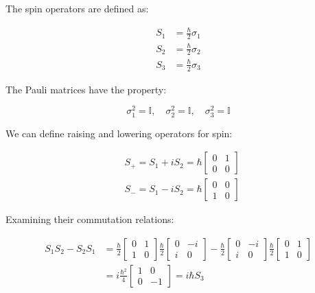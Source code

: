 \documentclass[italian]{HKNdocument}
\begin{document}
The spin operators are defined as:

\begin{align}
S_{1} & =\frac{\hbar}{2} \sigma_{1} \\
S_{2} & =\frac{\hbar}{2} \sigma_{2}  \label{eq:11.5}\\
S_{3} & =\frac{\hbar}{2} \sigma_{3}
\end{align}

The Pauli matrices have the property:

\begin{equation}
\sigma_{1}^{2}=\mathbb{I}, \quad \sigma_{2}^{2}=\mathbb{I}, \quad \sigma_{3}^{2}=\mathbb{I} \label{eq:11.6}
\end{equation}

We can define raising and lowering operators for spin:

\begin{align}
& S_{+}=S_{1}+i S_{2}=\hbar\left[\begin{array}{ll}
0 & 1 \\
0 & 0
\end{array}\right] \\
& S_{-}=S_{1}-i S_{2}=\hbar\left[\begin{array}{ll}
0 & 0 \\
1 & 0
\end{array}\right] \label{eq:11.7}
\end{align}

Examining their commutation relations:

\begin{align}
S_1 S_2 - S_2 S_1 &= \frac{\hbar}{2}\left[\begin{array}{ll}
0 & 1 \\
1 & 0
\end{array}\right] \frac{\hbar}{2}\left[\begin{array}{cc}
0 & -i \\
i & 0
\end{array}\right] - \frac{\hbar}{2}\left[\begin{array}{cc}
0 & -i \\
i & 0
\end{array}\right] \frac{\hbar}{2}\left[\begin{array}{ll}
0 & 1 \\
1 & 0
\end{array}\right] \\
&= i\frac{\hbar^{2}}{4}\left[\begin{array}{cc}
1 & 0 \\
0 & -1
\end{array}\right] = i\hbar S_3 \label{eq:11.8}
\end{align}
\end{document}
